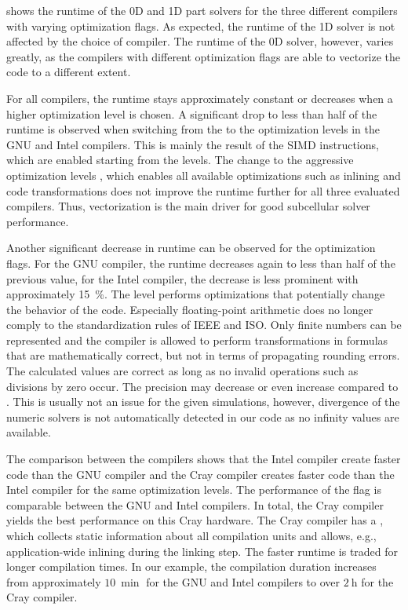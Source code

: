 shows the runtime of the 0D and 1D part solvers for the three different compilers with varying optimization flags.
As expected, the runtime of the 1D solver is not affected by the choice of compiler. The runtime of the 0D solver, however, varies greatly, as the compilers with different optimization flags are able to vectorize the code to a different extent.

For all compilers, the runtime stays approximately constant or decreases when a higher optimization level is chosen. A significant drop to less than half of the runtime is observed when switching from the  to the  optimization levels in the GNU and Intel compilers. This is mainly the result of the SIMD instructions, which are enabled starting from the  levels.
The change to the aggressive optimization levels , which enables all available optimizations such as inlining and code transformations does not improve the runtime further for all three evaluated compilers. Thus, vectorization is the main driver for good subcellular solver performance.

Another significant decrease in runtime can be observed for the  optimization flags. For the GNU compiler, the runtime decreases again to less than half of the previous value, for the Intel compiler, the decrease is less prominent with approximately \SI{15}{\percent}. The  level performs optimizations that potentially change the behavior of the code. 
Especially floating-point arithmetic does no longer comply to the standardization rules of IEEE and ISO. Only finite numbers can be represented and the compiler is allowed to perform transformations in formulas that are mathematically correct, but not in terms of propagating rounding errors. The calculated values are correct as long as no invalid operations such as divisions by zero occur. The precision may decrease or even increase compared to . This is usually not an issue for the given simulations, however, divergence of the numeric solvers is not automatically detected in our code as no infinity values are available.

The comparison between the compilers shows that the Intel compiler create faster code than the GNU compiler and the Cray compiler creates faster code than the Intel compiler for the same optimization levels. The performance of the  flag is comparable between the GNU and Intel compilers. In total, the Cray compiler yields the best performance on this Cray hardware. The Cray compiler has a , which collects static information about all compilation units and allows, e.g., application-wide inlining during the linking step. The faster runtime is traded for longer compilation times. In our example, the compilation duration increases from approximately $\SI{10}{\min}$ for the GNU and Intel compilers to over $\SI{2}{\hour}$ for the Cray compiler.

